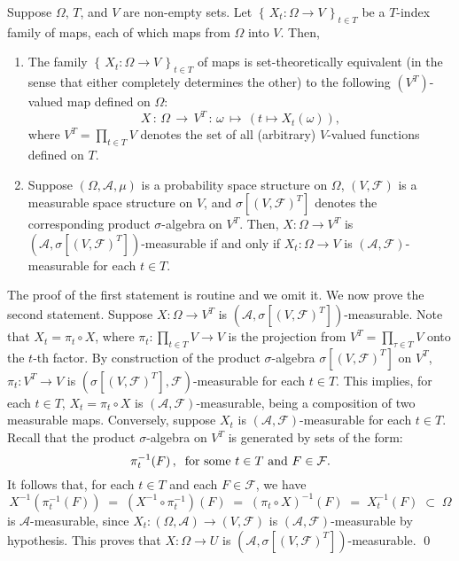 \begin{proposition}
\mbox{}\vskip 0.1cm
\noindent
Suppose $\Omega$, $T$, and $V$ are non-empty sets.
Let $\left\{\,X_{t} : \Omega \longrightarrow V \,\right\}_{t \in T}$
be a $T$-index family of maps, each of which maps from $\Omega$ into $V$.
Then,
\begin{enumerate}
\item
The family $\left\{\,X_{t} : \Omega \longrightarrow V \,\right\}_{t \in T}$
of maps is set-theoretically equivalent (in the sense that either completely determines the other)
to the following $(V^{T})$-valued map defined on $\Omega$:
\begin{equation*}
X \,:\, \Omega \,\longrightarrow\, V^{T} \,:\, \omega \,\longmapsto\, \left(t \longmapsto X_{t}(\omega)\right),
\end{equation*}
where $V^{T} = \prod_{t\in T}V$ denotes the set of all (arbitrary) $V$-valued functions defined on $T$.
\item
Suppose $\left(\Omega,\mathcal{A},\mu\right)$ is a probability space structure on $\Omega$,
$\left(V,\mathcal{F}\right)$ is a measurable space structure on $V$, and
$\sigma[(V,\mathcal{F})^{T}]$ denotes the corresponding product $\sigma$-algebra on $V^{T}$.
Then, $X : \Omega \longrightarrow V^{T}$ is
$\left(\mathcal{A},\sigma[(V,\mathcal{F})^{T}]\right)$-measurable if and only if
$X_{t} : \Omega \longrightarrow V$ is $(\mathcal{A},\mathcal{F})$-measurable for each $t \in T$.
\end{enumerate}
\end{proposition}
\proof
The proof of the first statement is routine and we omit it.
We now prove the second statement.
Suppose $X : \Omega \longrightarrow V^{T}$
is $(\mathcal{A},\sigma[(V,\mathcal{F})^{T}])$-measurable.
Note that $X_{t} = \pi_{t} \circ X$, where $\pi_{t} : \prod_{t\in T}V \longrightarrow V$
is the projection from $V^{T} = \prod_{\tau\in T}V$ onto the $t$-th factor.
By construction of the product $\sigma$-algebra $\sigma[(V,\mathcal{F})^{T}]$ on $V^{T}$,
$\pi_{t} : V^{T} \longrightarrow V$ is $(\sigma[(V,\mathcal{F})^{T}],\mathcal{F})$-measurable
for each $t \in T$.
This implies, for each $t \in T$, $X_{t} = \pi_{t} \circ X$ is
$(\mathcal{A},\mathcal{F})$-measurable, being a composition of two measurable maps.
Conversely, suppose $X_{t}$ is $(\mathcal{A},\mathcal{F})$-measurable for each $t \in T$.
Recall that the product $\sigma$-algebra on $V^{T}$ is generated by
sets of the form:
\begin{equation*}
\pi^{-1}_{t}\!\left(F\right),
\;\;\textnormal{for some $t \in T$ and $F \in \mathcal{F}$}.
\end{equation*}
It follows that, for each $t \in T$ and each $F \in \mathcal{F}$, we have
\begin{equation*}
X^{-1}\!\left(\pi^{-1}_{t}\!\left(F\right)\right)
\; = \; (X^{-1}\circ\pi^{-1}_{t})\!\left(F\right)
\; = \; (\pi_{t} \circ X)^{-1}\!\left(F\right)
\; = \; X_{t}^{-1}\!\left(F\right)
\; \subset \; \Omega
\end{equation*}
is $\mathcal{A}$-measurable, since
$X_{t} : (\Omega,\mathcal{A}) \longrightarrow (V,\mathcal{F})$
is $(\mathcal{A},\mathcal{F})$-measurable by hypothesis.
This proves that $X : \Omega \longrightarrow U$ is
$(\mathcal{A},\sigma[(V,\mathcal{F})^{T}])$-measurable.
\qed

